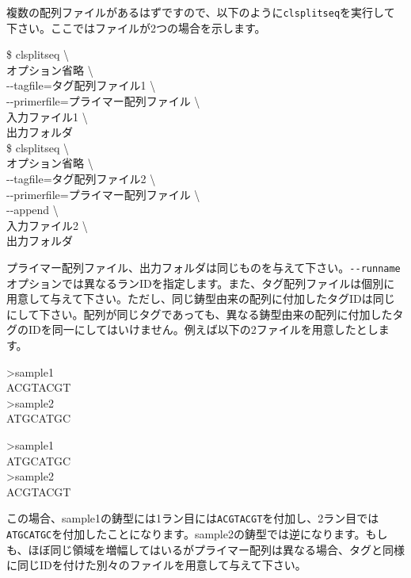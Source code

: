 \documentclass[titlepage,10pt,a4paper,english]{jsbook}
\newenvironment{pre}{\begin{leftbar}\raggedright\ttfamily\footnotesize\setlength{\baselineskip}{1.4em}}{\end{leftbar}\vspace{-1em}}
\newenvironment{cmd}{\begin{oframed}\raggedright\ttfamily\footnotesize\setlength{\baselineskip}{1.4em}}{\end{oframed}\vspace{-1em}}
\begin{document}
複数の配列ファイルがあるはずですので、以下のように\texttt{clsplitseq}を実行して下さい。ここではファイルが2つの場合を示します。
\begin{cmd}
\$ clsplitseq {\textbackslash}\\
オプション省略 {\textbackslash}\\
{-}{-}tagfile=タグ配列ファイル1 {\textbackslash}\\
{-}{-}primerfile=プライマー配列ファイル {\textbackslash}\\
入力ファイル1 {\textbackslash}\\
出力フォルダ\\
\$ clsplitseq {\textbackslash}\\
オプション省略 {\textbackslash}\\
{-}{-}tagfile=タグ配列ファイル2 {\textbackslash}\\
{-}{-}primerfile=プライマー配列ファイル {\textbackslash}\\
{-}{-}append {\textbackslash}\\
入力ファイル2 {\textbackslash}\\
出力フォルダ
\end{cmd}
プライマー配列ファイル、出力フォルダは同じものを与えて下さい。\texttt{{-}{-}runname}オプションでは異なるランIDを指定します。また、タグ配列ファイルは個別に用意して与えて下さい。ただし、同じ鋳型由来の配列に付加したタグIDは同じにして下さい。配列が同じタグであっても、異なる鋳型由来の配列に付加したタグのIDを同一にしてはいけません。例えば以下の2ファイルを用意したとします。
\begin{pre}
{\textgreater}sample1\\
ACGTACGT\\
{\textgreater}sample2\\
ATGCATGC
\end{pre}
\begin{pre}
{\textgreater}sample1\\
ATGCATGC\\
{\textgreater}sample2\\
ACGTACGT
\end{pre}
この場合、sample1の鋳型には1ラン目には\texttt{ACGTACGT}を付加し、2ラン目では\texttt{ATGCATGC}を付加したことになります。sample2の鋳型では逆になります。もしも、ほぼ同じ領域を増幅してはいるがプライマー配列は異なる場合、タグと同様に同じIDを付けた別々のファイルを用意して与えて下さい。
\end{document}
